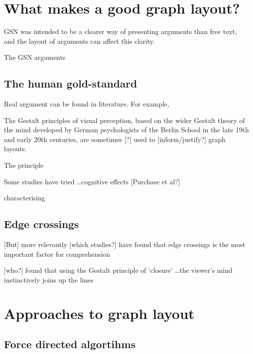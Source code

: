 \section{What makes a good graph layout?}

GSN was intended to be a clearer way of presenting arguments than free text,
and the layout of arguments can affect this clarity.

The GSN arguments 

\subsection{The human gold-standard}

Real argument  can be found in literature. For example, 

The Gestalt principles of visual perception,
based on the wider Gestalt theory of the mind developed by German psychologists of the Berlin School in the late 19th and early 20th centuries,
are sometimes [?] used to [inform/justify?] graph layouts.

The principle 

Some studies have tried \ldots cognitive effects [Purchase et al?]

characterising 


\subsection{Edge crossings}


[But] more relevantly [which studies?] have found that edge crossings is the most important factor for comprehension

[who?] found that using the Gestalt principle of `closure' \ldots the viewer's mind instinctively joins up the lines




\section{Approaches to graph layout}

\subsection{Force directed algortihms}

